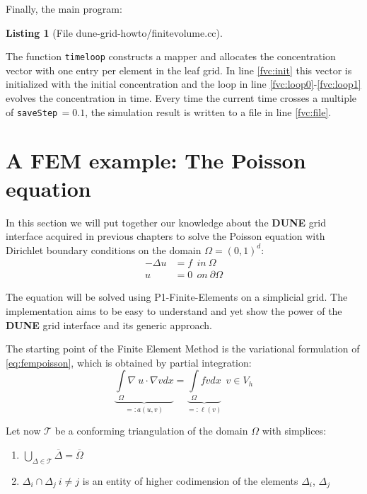 \documentclass[11pt,a4paper,headinclude,footinclude,DIV16,headings=normal]{scrreprt}
\newcommand{\Dune}{{\sffamily\bfseries DUNE}\xspace}
\newtheorem{lst}{Listing}
\begin{document}
Finally, the main program:

\begin{lst}[File dune-grid-howto/finitevolume.cc] \mbox{}
\nopagebreak

\end{lst}

The function \lstinline!timeloop! constructs a mapper and allocates the
concentration vector with one entry per element in the leaf grid. In
line \ref{fvc:init} this vector is initialized with the initial
concentration and the loop in line \ref{fvc:loop0}-\ref{fvc:loop1}
evolves the concentration in time. Every time the current time crosses a multiple of 
\lstinline!saveStep!\,$=0.1$, the simulation result is
written to a file in line \ref{fvc:file}.

\section{A FEM example: The Poisson equation}
\label{Sec:FEMPoisson}

In this section we will put together our knowledge about the \Dune{} grid interface acquired in previous chapters to solve the Poisson equation with Dirichlet boundary conditions on the domain $\Omega = (0,1)^d$:
\begin{align} \label{eq:fempoisson}
 -\Delta u & = f \ \ in \ \Omega\\
u & = 0 \ \ on \ \partial\Omega
\end{align}

The equation will be solved using P1-Finite-Elements on a simplicial grid. The implementation aims to be easy to understand and yet show the power of the \Dune{} grid interface and its generic approach.

The starting point of the Finite Element Method is the variational formulation of \ref{eq:fempoisson}, which is obtained by partial integration:
\begin{equation}
\underbrace{\int\limits_{\Omega}\nabla\ u\cdot\nabla v dx}_{ =:a(u,v)}
= \underbrace{\int\limits_{\Omega} fv dx}_{=:\ell (v)} \ \ v\in V_h
\end{equation}

Let now $\mathcal{T}$ be a conforming triangulation of the domain $\Omega$ with simplices:
\renewcommand{\labelenumi}{(\roman{enumi})}
\begin{center}
\begin{enumerate}
 \item $\bigcup\limits_{\Delta\in\mathcal{T}} \overline{\Delta} = \overline{\Omega}$
 \item $\Delta_i\cap\Delta_j \ i\neq j$ is an entity of
higher codimension of the elements $\Delta_i$, $\Delta_j$
\end{enumerate}
\end{center}
\end{document}
